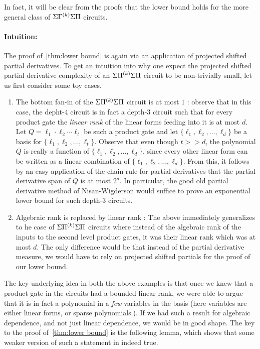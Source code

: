 \begin{remark}
In fact, it will be clear from the proofs that the lower bound holds for the more general class of $\Sigma{\Gamma^{(k)}}\Sigma\Pi$ circuits. 
\end{remark}





\paragraph{Intuition:}
The proof of~\autoref{thm:lower bound} is again via an application of projected shifted partial derivatives. To get an intuition into why one expect the projected shifted partial derivative complexity of an $\Sigma{\Pi^{(k)}}\Sigma\Pi$ circuit to be non-trivially small, let us first consider some toy cases.

\begin{enumerate}
\item The bottom fan-in of the $\Sigma{\Pi^{(k)}}\Sigma\Pi$ circuit is at most $1$ : observe that in this case, the depht-$4$ circuit is in fact a depth-$3$ circuit such that for every product gate the \emph{linear rank} of the linear forms feeding into it is at most $d$. Let $Q = \ell_1\cdot \ell_2\cdots \ell_t$ be such a product gate and let $\{\ell_1, \ell_2, \ldots, \ell_d\}$ be a basis for $\{\ell_1, \ell_2, \ldots, \ell_t\}$. Observe that even though $t >> d$, the polynomial $Q$ is really a function of $\{\ell_1, \ell_2, \ldots, \ell_d\}$, since every other linear form can be written as a linear combination of $\{\ell_1, \ell_2, \ldots, \ell_d\}$. From this, it follows by an easy application of the chain rule for partial derivatives that the partial derivative span of $Q$ is at most $2^d$. In particular, the good old partial derivative method of Nisan-Wigderson would suffice to prove an exponential lower bound for such depth-$3$ circuits. 

\item Algebraic rank is replaced by linear rank : The above  immediately generalizes to he case of $\Sigma{\Pi^{(k)}}\Sigma\Pi$  circuits where instead of the algebraic rank of the inputs to the second level product gates, it was their linear rank which was at most $d$. The only difference would be that instead of the partial derivative measure, we would have to rely on projected shifted partials for the proof of our lower bound.  
\end{enumerate}

The key underlying idea in both the above examples is that once we knew that a product gate in the circuits had a bounded linear rank, we were able to argue that it is in fact a polynomial in a \emph{few} variables in the basis (here variables are either linear forms, or sparse polynomials.). If we had such a result for algebraic dependence, and not just linear dependence, we would be in good shape. 
The key to the proof of~\autoref{thm:lower bound} is the following lemma, which shows that some weaker version of such a statement in indeed true. 

